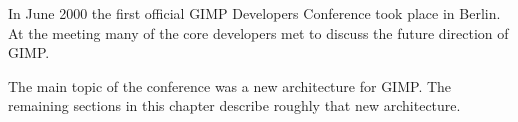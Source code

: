 In June 2000 the first official GIMP Developers Conference took place in
Berlin. At the meeting many of the core developers met to discuss the future
direction of GIMP.

The main topic of the conference was a new architecture for GIMP. The remaining
sections in this chapter describe roughly that new architecture. 
